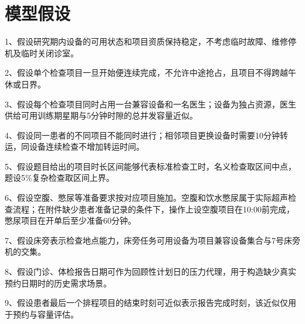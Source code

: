 \section{模型假设}

1、假设研究期内设备的可用状态和项目资质保持稳定，不考虑临时故障、维修停机及临时关闭诊室。

2、假设单个检查项目一旦开始便连续完成，不允许中途抢占，且项目不得跨越午休或日界。

3、假设每个检查项目同时占用一台兼容设备和一名医生；设备为独占资源，医生供给可用训练期星期与5分钟时隙的总并发容量近似。

4、假设同一患者的不同项目不能同时进行；相邻项目更换设备时需要10分钟转运，同设备连续检查不增加转运时间。

5、假设题目给出的项目时长区间能够代表标准检查工时，名义检查取区间中点，题设5\%复杂检查取区间上界。

6、假设空腹、憋尿等准备要求按对应项目施加。空腹和饮水憋尿属于实际超声检查流程\cite{hrhospital2025}；在附件缺少患者准备记录的条件下，操作上设空腹项目在10:00前完成，憋尿项目在开单后至少准备60分钟。

7、假设床旁表示检查地点能力，床旁任务可用设备为项目兼容设备集合与7号床旁机的交集。

8、假设门诊、体检报告日期可作为回顾性计划日的压力代理，用于构造缺少真实预约日期时的历史需求场景。

9、假设患者最后一个排程项目的结束时刻可近似表示报告完成时刻，该近似仅用于预约与容量评估。
